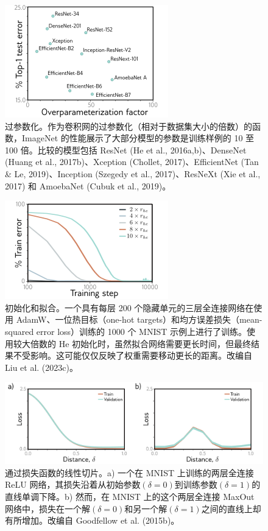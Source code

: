\begin{figure}[ht!]
\centering
\includegraphics[width=0.7\linewidth]{png/chapter20/WhyOverparam.png}
\caption{过参数化。作为卷积网的过参数化（相对于数据集大小的倍数）的函数，ImageNet 的性能展示了大部分模型的参数是训练样例的 10 至 100 倍。比较的模型包括 ResNet (He et al., 2016a,b)、DenseNet (Huang et al., 2017b)、Xception (Chollet, 2017)、EfficientNet (Tan \& Le, 2019)、Inception (Szegedy et al., 2017)、ResNeXt (Xie et al., 2017) 和 AmoebaNet (Cubuk et al., 2019)。}
\end{figure}


\begin{figure}[ht!]
\centering
\includegraphics[width=0.7\linewidth]{png/chapter20/WhyOmniGrok2.png}
\caption{初始化和拟合。一个具有每层 200 个隐藏单元的三层全连接网络在使用 AdamW、一位热目标（one-hot targets）和均方误差损失（mean-squared error loss）训练的 1000 个 MNIST 示例上进行了训练。使用较大倍数的 He 初始化时，虽然拟合网络需要更长时间，但最终结果不受影响。这可能仅仅反映了权重需要移动更长的距离。改编自 Liu et al. (2023c)。}
\end{figure}


\begin{figure}[ht!]
\centering
\includegraphics[width=0.7\linewidth]{png/chapter20/WhyGoodFellowRoute.png}
\caption{通过损失函数的线性切片。a) 一个在 MNIST 上训练的两层全连接 ReLU 网络，其损失沿着从初始参数\((\delta=0)\)到训练参数\((\delta=1)\)的直线单调下降。b) 然而，在 MNIST 上的这个两层全连接 MaxOut 网络中，损失在一个解\((\delta=0)\)和另一个解\((\delta=1)\)之间的直线上却有所增加。改编自 Goodfellow et al. (2015b)。}
\end{figure}


